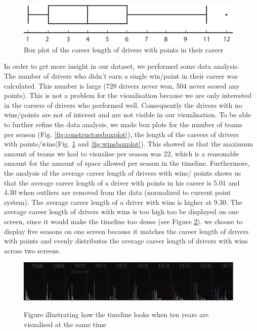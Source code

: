 \documentclass{sigchi}
\begin{document}
\begin{figure}[ht]
\centering
\includegraphics[width=0.8\columnwidth]{images/pointsboxplot.pdf}
\caption{Box plot of the career length of drivers with points in their career}
\label{fig:pointsboxplot}
\end{figure}
In order to get 
more insight in our dataset, we performed some data analysis. The number of drivers who didn’t earn a single win/point in their career was calculated. This number is large (728 drivers never won, 504 never scored any points). This is not a problem for the visualisation because we are only interested in the careers of drivers who performed well. Consequently the drivers with no wins/points are not of interest and are not visible in our visualisation. To be able to further refine the data analysis, we made box plots for the number of teams per season (Fig. \ref{fig:constructorsboxplot}), the length of the careers of drivers with points/wins(Fig. \ref{fig:pointsboxplot} and \ref{fig:winsboxplot}). This showed us that the maximum amount of teams we had to visualise per season was 22, which is a reasonable amount for the amount of space allowed per season in the timeline. Furthermore, the analysis of the average career length of drivers with wins/ points shows us that the average career length of a driver with points in his career is 5.01 and 4.30 when outliers are removed from the data (normalized to current point system). The average career length of a driver with wins is higher at 9.30. The average career length of drivers with wins is too high too be displayed on one screen, since it would make the timeline too dense (see Figure \ref{fig:numYears}). we choose to display five seasons on one screen because it matches the career length of drivers with points and evenly distributes the average career length of drivers with wins across two screens.

\begin{figure}[ht]
\centering
\includegraphics[width=1\columnwidth]{images/dense.png}
\label{fig:numYears}
\caption{Figure illustrating how the timeline looks when ten years are visualised at the same time}
\end{figure}
\end{document}

